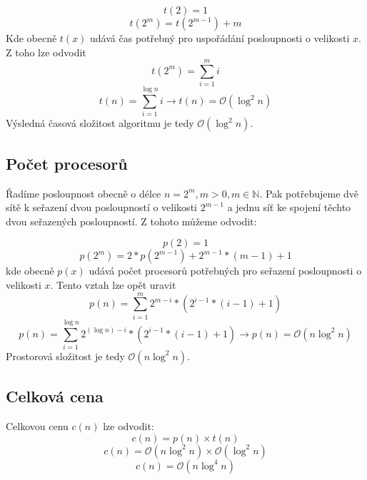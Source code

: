 \documentclass[12pt,a4paper]{article}
\begin{document}
\begin{equation}
    t(2) = 1
\end{equation}
\begin{equation}
    t(2^m) = t(2^{m-1}) + m
\end{equation}
Kde obecně $t(x)$ udává čas potřebný pro uspořádání posloupnosti o velikosti $x$.
Z toho lze odvodit
\begin{equation}
    t(2^m) = \sum_{i=1}^{m} i
\end{equation}
\begin{equation}
    t(n) = \sum_{i=1}^{\log n} i \rightarrow t(n) = \mathcal{O}(\log^2 n)
    \label{eq:cas}
\end{equation}
Výsledná časová složitost algoritmu je tedy $\mathcal{O}(\log^2 n)$.

\subsection*{Počet procesorů}
\label{sub:pocet_procesoru}

Řadíme posloupnost obecně o délce $n = 2^m, m > 0, m \in \mathbb{N}$. Pak potřebujeme dvě sítě k seřazení dvou posloupností o velikosti $2^{m-1}$ a jednu síť ke spojení těchto dvou seřazených posloupností.
Z tohoto můžeme odvodit:

\begin{equation}
    p(2) = 1
\end{equation}
\begin{equation}
    p(2^m) = 2 * p(2^{m-1}) + 2^{m-1} * (m - 1) + 1
\end{equation}
kde obecně $p(x)$ udává počet procesorů potřebných pro seřazení posloupnosti o velikosti $x$.
Tento vztah lze opět uravit 
\begin{equation}
    p(n) = \sum_{i=1}^{m} 2^{m-i} * (2^{i-1} * (i-1) + 1)
\end{equation}
\begin{equation}
    p(n) = \sum_{i=1}^{\log n} 2^{(\log n)-i} * (2^{i-1} * (i-1) + 1) \rightarrow p(n) = \mathcal{O}(n \log^2 n)
    \label{eq:prostor}
\end{equation}
Prostorová složitost je tedy $\mathcal{O}(n \log^2 n)$.

\subsection*{Celková cena}
\label{sub:celkova_cena}
Celkovou cenu $c(n)$ lze odvodit:
\begin{equation}
    c(n) = p(n) \times t(n)
\end{equation}
\begin{equation}
    c(n) = \mathcal{O}(n\log^2 n) \times \mathcal{O}(\log^2 n)
\end{equation}
\begin{equation}    
    c(n) = \mathcal{O}(n \log^4 n)
    \label{eq:cena}
\end{equation}
\end{document}
